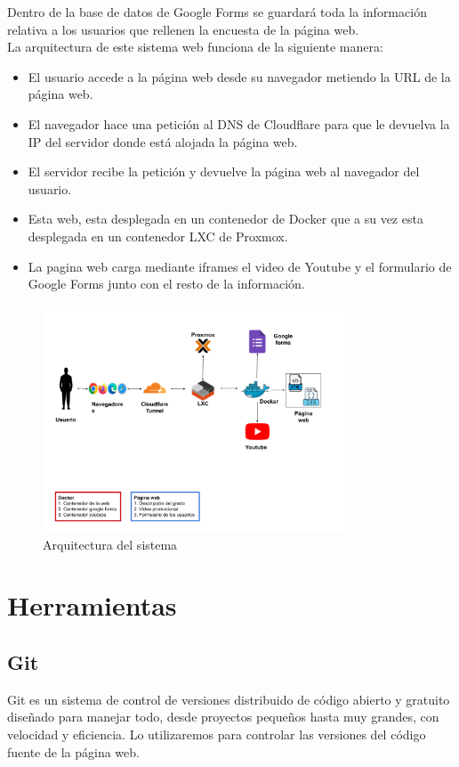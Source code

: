 \documentclass{report}
\begin{document}
        Dentro de la base de datos de Google Forms se guardará toda la información relativa a los usuarios que rellenen la encuesta de la página web.\\
        \clearpage
        La arquitectura de este sistema web funciona de la siguiente manera:
        \begin{itemize}
            \item El usuario accede a la página web desde su navegador metiendo la URL de la página web.
            \item El navegador hace una petición al DNS de Cloudflare para que le devuelva la IP del servidor donde está alojada la página web.
            \item El servidor recibe la petición y devuelve la página web al navegador del usuario.
            \item Esta web, esta desplegada en un contenedor de Docker que a su vez esta desplegada en un contenedor LXC de Proxmox.
            \item La pagina web carga mediante iframes el video de Youtube y el formulario de Google Forms junto con el resto de la información.
        \end{itemize}
        \begin{figure}[H]
            \centering
            \includegraphics[width=0.8\textwidth]{./img/arquitectura.png}
            \caption{Arquitectura del sistema}
        \end{figure}
    \chapter{Herramientas}
        \section*{Git}
            Git es un sistema de control de versiones distribuido de código abierto y gratuito diseñado para manejar todo, desde proyectos pequeños hasta muy grandes, con velocidad y eficiencia. Lo utilizaremos para controlar las versiones del código fuente de la página web.
\end{document}
